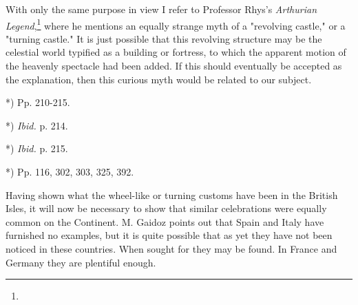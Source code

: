 \documentclass[a4paper, 11pt, oneside, polutonikogreek, english]{article}
\begin{document}
With only the same purpose in view I refer to Professor Rhys's \emph{Arthurian Legend},\footnote{} where he mentions an equally strange myth of a "revolving castle," or a "turning castle." It is just possible that this revolving structure may be the celestial world typified as a building or fortress, to which the apparent motion of the heavenly spectacle had been added. If this should eventually be accepted as the explanation, then this curious myth would be related to our subject.

*) Pp. 210-215.

*) \emph{Ibid.} p. 214.

*) \emph{Ibid.} p. 215.

*) Pp. 116, 302, 303, 325, 392.

Having shown what the wheel-like or turning customs have been in the British Isles, it will now be necessary to show that similar celebrations were equally common on the Continent. M. Gaidoz points out that Spain and Italy have furnished no examples, but it is quite possible that as yet they have not been noticed in these countries. When sought for they may be found. In France and Germany they are plentiful enough.

\end{document}
